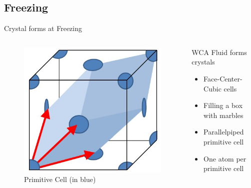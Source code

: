 \documentclass{beamer}
\begin{document}
\subsection*{Freezing}
\begin{frame}{Crystal forms at Freezing}
	\begin{columns}[t]
        \begin{figure}
            \centering
            \includegraphics[width=0.7\columnwidth]{PrimitiveCellLightBlue.png}
            \caption{Primitive Cell (in blue)}
          \end{figure}
		\begin{block}{WCA Fluid forms crystals}
			\begin{itemize}
				\item Face-Center-Cubic cells 
				\item Filling a box with marbles
				\item Parallelpiped primitive cell 
				\item One atom per primitive cell
			\end{itemize}
		\end{block}
	\end{columns}	
\end{frame}
      
\end{document}

